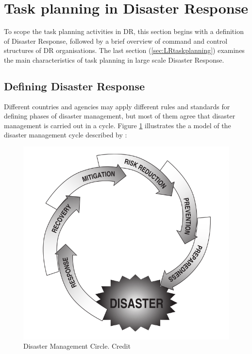 \section{Task planning in Disaster Response}\label{sec:lrplanning}
To scope the task planning activities in \ac{DR}, this section begins with a definition of Disaster Response, followed by a brief overview of command and control structures of \ac{DR} organisations. The last section (\ref{sec:LRtaskplanning}) examines the main characteristics of task planning in large scale Disaster Response.\\

\subsection{Defining Disaster Response}
Different countries and agencies may apply different rules and standards for defining phases of disaster management, but most of them agree that disaster management is carried out in a cycle. Figure \ref{fig:drCircle} illustrates the a model of the disaster management cycle described by \citep{Wattegama2012}:\\

\begin{figure}[h]
  \centering
  \includegraphics[width=1\textwidth]{img/Background/drCircle}
  \caption{Disaster Management Circle. Credit \cite{Wattegama2012}}
  \label{fig:drCircle}
\end{figure}

